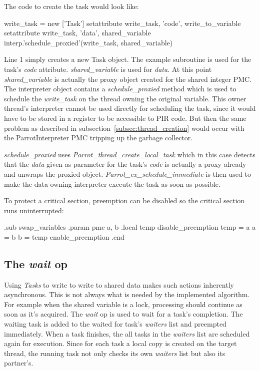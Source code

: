 \documentclass[bachelor,english]{hgbthesis}
\begin{document}
The code to create the task would look like:
%
\begin{GenericCode}
    write_task = new ['Task']
    setattribute write_task, 'code', write_to_variable
    setattribute write_task, 'data', shared_variable
    interp.'schedule_proxied'(write_task, shared_variable)
\end{GenericCode}
%
Line 1 simply creates a new Task object. The example subroutine is used for the task's \textit{code} attribute. \textit{shared\_variable} is used for \textit{data}. At this point \textit{shared\_variable} is actually the proxy object created for the shared integer PMC. The interpreter object contains a \textit{schedule\_proxied} method which is used to schedule the \textit{write\_task} on the thread owning the original variable. This owner thread's interpreter cannot be used directly for scheduling the task, since it would have to be stored in a register to be accessible to PIR code. But then the same problem as described in subsection~\ref{subsec:thread_creation} would occur with the ParrotInterpreter PMC tripping up the garbage collector.

\textit{schedule\_proxied} uses \textit{Parrot\_thread\_create\_local\_task} which in this case detects that the \textit{data} given as parameter for the task's \textit{code} is actually a proxy already and unwraps the proxied object. \textit{Parrot\_cx\_schedule\_immediate} is then used to make the data owning interpreter execute the task as soon as possible.

To protect a critical section, preemption can be disabled so the critical section runs uninterrupted:
%
\begin{GenericCode}
.sub swap_variables
    .param pmc a, b
    .local temp
    disable_preemption
    temp = a
    a = b
    b = temp
    enable_preemption
.end
\end{GenericCode}

\subsection{The \textit{wait} op}

Using \textit{Tasks} to write to write to shared data makes such actions inherently asynchronous. This is not always what is needed by the implemented algorithm. For example when the shared variable is a lock, processing should continue as soon as it's acquired. The \textit{wait} op is used to wait for a task's completion. The waiting task is added to the waited for task's \textit{waiters} list and preempted immediately. When a task finishes, the all tasks in the \textit{waiters} list are scheduled again for execution. Since for each task a local copy is created on the target thread, the running task not only checks its own \textit{waiters} list but also its partner's.
\end{document}
